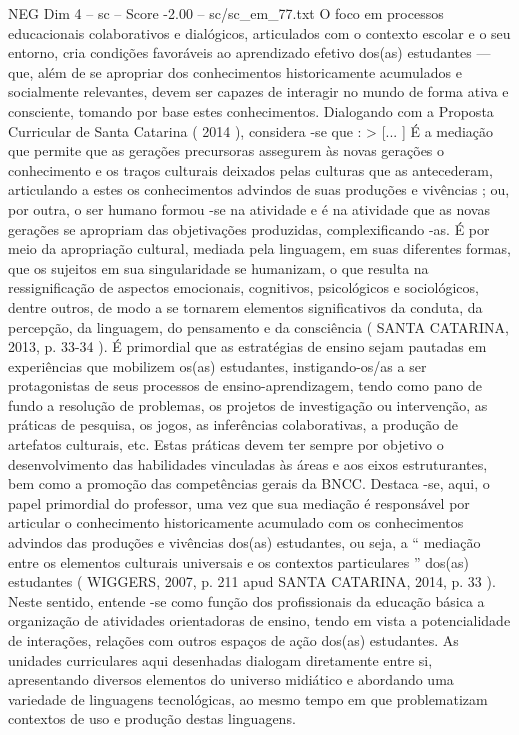 \begin{textsample}{NEG Dim 4 – sc – Score -2.00 – sc/sc\_em\_77.txt}
O foco em processos educacionais colaborativos e dialógicos, articulados com o contexto escolar e o seu entorno, cria condições favoráveis ao aprendizado efetivo dos(as) estudantes — que, além de se apropriar dos conhecimentos historicamente acumulados e socialmente relevantes, devem ser capazes de interagir no mundo de forma ativa e consciente, tomando por base estes conhecimentos.
Dialogando com a Proposta Curricular de Santa Catarina ( 2014 ), considera -se que : > [... ] É a mediação que permite que as gerações precursoras assegurem às novas gerações o conhecimento e os traços culturais deixados pelas culturas que as antecederam, articulando a estes os conhecimentos advindos de suas produções e vivências ; ou, por outra, o ser humano formou -se na atividade e é na atividade que as novas gerações se apropriam das objetivações produzidas, complexificando -as.
É por meio da apropriação cultural, mediada pela linguagem, em suas diferentes formas, que os sujeitos em sua singularidade se humanizam, o que resulta na ressignificação de aspectos emocionais, cognitivos, psicológicos e sociológicos, dentre outros, de modo a se tornarem elementos significativos da conduta, da percepção, da linguagem, do pensamento e da consciência ( SANTA CATARINA, 2013, p. 33-34 ).
É primordial que as estratégias de ensino sejam pautadas em experiências que mobilizem os(as) estudantes, instigando-os/as a ser protagonistas de seus processos de ensino-aprendizagem, tendo como pano de fundo a resolução de problemas, os projetos de investigação ou intervenção, as práticas de pesquisa, os jogos, as inferências colaborativas, a produção de artefatos culturais, etc.
Estas práticas devem ter sempre por objetivo o desenvolvimento das habilidades vinculadas às áreas e aos eixos estruturantes, bem como a promoção das competências gerais da BNCC.
Destaca -se, aqui, o papel primordial do professor, uma vez que sua mediação é responsável por articular o conhecimento historicamente acumulado com os conhecimentos advindos das produções e vivências dos(as) estudantes, ou seja, a “ mediação entre os elementos culturais universais e os contextos particulares ” dos(as) estudantes ( WIGGERS, 2007, p. 211 apud SANTA CATARINA, 2014, p. 33 ).
Neste sentido, entende -se como função dos profissionais da educação básica a organização de atividades orientadoras de ensino, tendo em vista a potencialidade de interações, relações com outros espaços de ação dos(as) estudantes.
As unidades curriculares aqui desenhadas dialogam diretamente entre si, apresentando diversos elementos do universo midiático e abordando uma variedade de linguagens tecnológicas, ao mesmo tempo em que problematizam contextos de uso e produção destas linguagens.

\end{textsample}
